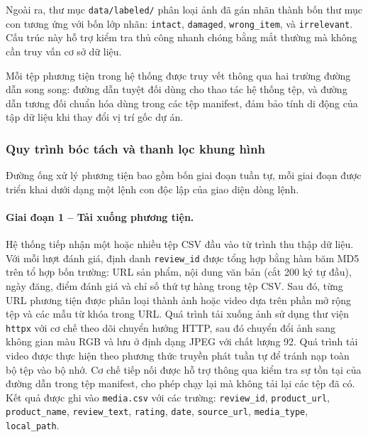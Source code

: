 Ngoài ra, thư mục \texttt{data/labeled/} phân loại ảnh đã gán nhãn thành bốn thư mục
con tương ứng với bốn lớp nhãn: \texttt{intact}, \texttt{damaged}, \texttt{wrong\_item},
và \texttt{irrelevant}. Cấu trúc này hỗ trợ kiểm tra thủ công nhanh chóng bằng mắt
thường mà không cần truy vấn cơ sở dữ liệu.

Mỗi tệp phương tiện trong hệ thống được truy vết thông qua hai trường đường dẫn song
song: đường dẫn tuyệt đối dùng cho thao tác hệ thống tệp, và đường dẫn tương đối
chuẩn hóa dùng trong các tệp manifest, đảm bảo
tính di động của tập dữ liệu khi thay đổi vị trí gốc dự án.



\subsubsection{Quy trình bóc tách và thanh lọc khung hình}

Đường ống xử lý phương tiện bao gồm bốn giai đoạn tuần tự, mỗi giai đoạn được triển
khai dưới dạng một lệnh con độc lập của giao diện dòng lệnh.

\paragraph{Giai đoạn 1 -- Tải xuống phương tiện.}
Hệ thống tiếp nhận một hoặc nhiều tệp CSV đầu vào từ trình thu thập dữ liệu. Với mỗi
lượt đánh giá, định danh \texttt{review\_id} được tổng hợp bằng hàm băm MD5 trên tổ
hợp bốn trường: URL sản phẩm, nội dung văn bản (cắt 200 ký tự đầu), ngày đăng, điểm
đánh giá và chỉ số thứ tự hàng trong tệp CSV. Sau đó, từng URL phương tiện được phân
loại thành ảnh hoặc video dựa trên phần mở rộng tệp và các mẫu từ khóa trong URL.
Quá trình tải xuống ảnh sử dụng thư viện \texttt{httpx} với cơ chế theo dõi chuyển
hướng HTTP, sau đó chuyển đổi ảnh sang không gian màu RGB và lưu ở định dạng JPEG với
chất lượng 92. Quá trình tải video được thực hiện theo phương thức truyền phát tuần tự
để tránh nạp toàn bộ tệp vào bộ nhớ. Cơ chế tiếp nối
 được hỗ trợ thông qua kiểm tra sự tồn tại của đường dẫn trong tệp
manifest, cho phép chạy lại mà không tải lại các tệp đã có. Kết quả được ghi vào
\texttt{media.csv} với các trường: \texttt{review\_id}, \texttt{product\_url},
\texttt{product\_name}, \texttt{review\_text}, \texttt{rating}, \texttt{date},
\texttt{source\_url}, \texttt{media\_type}, \texttt{local\_path}.

